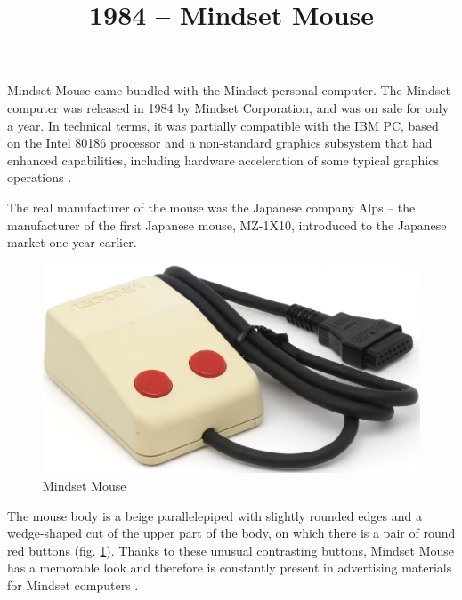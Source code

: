 \documentclass[11pt, a4paper]{article}
\begin{document}
\title{1984 -- Mindset Mouse}
\date{}
\maketitle
{}

Mindset Mouse came bundled with the Mindset personal computer. The Mindset computer was released in 1984 by Mindset Corporation, and was on sale for only a year. In technical terms, it was partially compatible with the IBM PC, based on the Intel 80186 processor and a non-standard graphics subsystem that had enhanced capabilities, including hardware acceleration of some typical graphics operations \cite{byteMagazine}.

The real manufacturer of the mouse was the Japanese company Alps -- the manufacturer of the first Japanese mouse, MZ-1X10, introduced to the Japanese market one year earlier.

\begin{figure}[h]
   \centering
    \includegraphics[scale=0.6]{1984_mindset_mouse/pic_30.jpg}
    \caption{Mindset Mouse}
    \label{fig:MindsetMousePic}
\end{figure}

The mouse body is a beige parallelepiped with slightly rounded edges and a wedge-shaped cut of the upper part of the body, on which there is a pair of round red buttons (fig. \ref{fig:MindsetMousePic}). Thanks to these unusual contrasting buttons, Mindset Mouse has a memorable look and therefore is constantly present in advertising materials for Mindset computers \cite{adv}.
\end{document}
